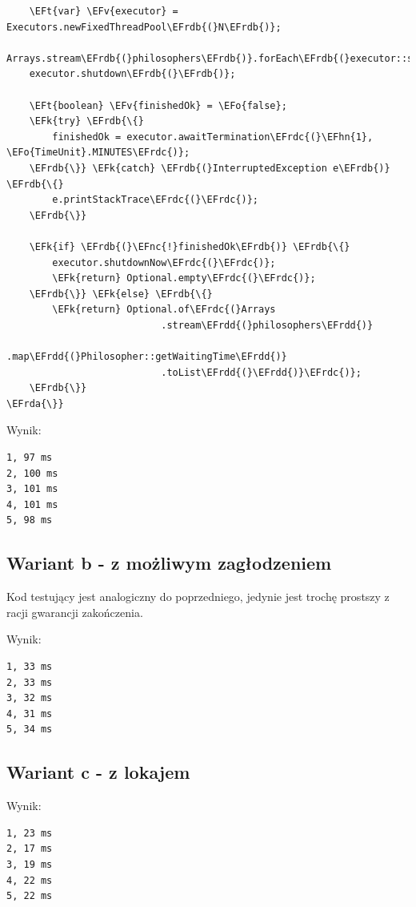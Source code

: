 \documentclass[11pt]{article}
\newcommand{\EFk}[1]{\textcolor{EFk}{#1}} %
\newcommand{\EFv}[1]{\textcolor{EFv}{#1}} %
\newcommand{\EFt}[1]{\textcolor{EFt}{#1}} %
\newcommand{\EFo}[1]{\textcolor{EFo}{#1}} %
\newcommand{\EFnc}[1]{#1} %
\newcommand{\EFhn}[1]{\textcolor{EFhn}{#1}} %
\newcommand{\EFrda}[1]{\textcolor{EFrda}{#1}} %
\newcommand{\EFrdb}[1]{\textcolor{EFrdb}{#1}} %
\newcommand{\EFrdc}[1]{\textcolor{EFrdc}{#1}} %
\newcommand{\EFrdd}[1]{\textcolor{EFrdd}{#1}} %
\begin{document}
\begin{Code}
\begin{Verbatim}
    \EFt{var} \EFv{executor} = Executors.newFixedThreadPool\EFrdb{(}N\EFrdb{)};
    Arrays.stream\EFrdb{(}philosophers\EFrdb{)}.forEach\EFrdb{(}executor::submit\EFrdb{)};
    executor.shutdown\EFrdb{(}\EFrdb{)};

    \EFt{boolean} \EFv{finishedOk} = \EFo{false};
    \EFk{try} \EFrdb{\{}
        finishedOk = executor.awaitTermination\EFrdc{(}\EFhn{1}, \EFo{TimeUnit}.MINUTES\EFrdc{)};
    \EFrdb{\}} \EFk{catch} \EFrdb{(}InterruptedException e\EFrdb{)} \EFrdb{\{}
        e.printStackTrace\EFrdc{(}\EFrdc{)};
    \EFrdb{\}}

    \EFk{if} \EFrdb{(}\EFnc{!}finishedOk\EFrdb{)} \EFrdb{\{}
        executor.shutdownNow\EFrdc{(}\EFrdc{)};
        \EFk{return} Optional.empty\EFrdc{(}\EFrdc{)};
    \EFrdb{\}} \EFk{else} \EFrdb{\{}
        \EFk{return} Optional.of\EFrdc{(}Arrays
                           .stream\EFrdd{(}philosophers\EFrdd{)}
                           .map\EFrdd{(}Philosopher::getWaitingTime\EFrdd{)}
                           .toList\EFrdd{(}\EFrdd{)}\EFrdc{)};
    \EFrdb{\}}
\EFrda{\}}
\end{Verbatim}
\end{Code}

Wynik:
\begin{tcolorbox}
\begin{Verbatim}
1, 97 ms
2, 100 ms
3, 101 ms
4, 101 ms
5, 98 ms
\end{Verbatim}

\end{tcolorbox}
\subsection*{Wariant b - z możliwym zagłodzeniem}
\label{sec:org45432a5}
Kod testujący jest analogiczny do poprzedniego, jedynie jest trochę prostszy z racji
gwarancji zakończenia.

Wynik:
\begin{tcolorbox}
\begin{Verbatim}
1, 33 ms
2, 33 ms
3, 32 ms
4, 31 ms
5, 34 ms
\end{Verbatim}


\end{tcolorbox}
\subsection*{Wariant c - z lokajem}
\label{sec:orga7007aa}
Wynik:
\begin{tcolorbox}
\begin{Verbatim}
1, 23 ms
2, 17 ms
3, 19 ms
4, 22 ms
5, 22 ms
\end{Verbatim}



\end{tcolorbox}
\end{document}
